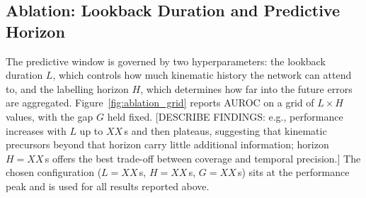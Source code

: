 \subsection{Ablation: Lookback Duration and Predictive Horizon}

The predictive window is governed by two hyperparameters: the lookback
duration $L$, which controls how much kinematic history the network can
attend to, and the labelling horizon $H$, which determines how far into the
future errors are aggregated.
Figure~\ref{fig:ablation_grid} reports AUROC on a grid of $L \times H$ values,
with the gap $G$ held fixed.
[DESCRIBE FINDINGS: e.g., performance increases with $L$ up to $XX$\,s and
then plateaus, suggesting that kinematic precursors beyond that horizon carry
little additional information; horizon $H = XX$\,s offers the best
trade-off between coverage and temporal precision.]
The chosen configuration ($L = XX$\,s, $H = XX$\,s, $G = XX$\,s) sits at
the performance peak and is used for all results reported above.
